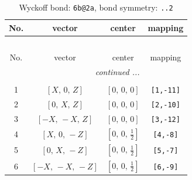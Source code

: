 \documentclass[fleqn,8pt]{jsarticle}
\begin{document}
\begin{longtable}{cccc}
\caption{Wyckoff bond: {\tt 6b@2a}, bond symmetry: {\tt ..2}}
 \\
 \hline \hline
No. & vector & center & mapping \\ \hline \endfirsthead

\multicolumn{3}{l}{\tablename\ \thetable{}} \\
 \hline \hline
No. & vector & center & mapping \\ \hline \endhead

 \hline \hline
\multicolumn{3}{r}{\footnotesize\it continued ...} \\ \endfoot

 \hline \hline
\multicolumn{3}{r}{} \\ \endlastfoot

1 & $\left[ X,\, 0,\, Z \right]$ & $\left[ 0,\, 0,\, 0 \right]$ & {\tt [1,-11]} \\ \hline
2 & $\left[ 0,\, X,\, Z \right]$ & $\left[ 0,\, 0,\, 0 \right]$ & {\tt [2,-10]} \\ \hline
3 & $\left[ - X,\, - X,\, Z \right]$ & $\left[ 0,\, 0,\, 0 \right]$ & {\tt [3,-12]} \\ \hline
4 & $\left[ X,\, 0,\, - Z \right]$ & $\left[ 0,\, 0,\, \frac{1}{2} \right]$ & {\tt [4,-8]} \\ \hline
5 & $\left[ 0,\, X,\, - Z \right]$ & $\left[ 0,\, 0,\, \frac{1}{2} \right]$ & {\tt [5,-7]} \\ \hline
6 & $\left[ - X,\, - X,\, - Z \right]$ & $\left[ 0,\, 0,\, \frac{1}{2} \right]$ & {\tt [6,-9]} \\
\end{longtable}
\renewcommand{\arraystretch}{1.2}
\end{document}
